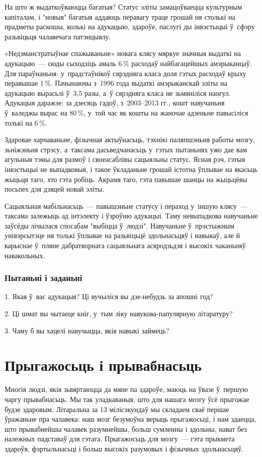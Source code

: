 На што ж выдаткоўваюцца багатыя? Статус эліты замацоўваецца культурным капіталам, і "новыя" багатыя аддаюць перавагу траце грошай ня столькі на прадметы раскошы, колькі на адукацыю, здароўе, паслугі ды інвэстыцыі ў~сфэру разьвіцьця чалавечага патэнцыялу.

«Недэманстратыўнае спажываньне» новага клясу мяркуе значныя выдаткі на адукацыю~--- сюды сыходзіць амаль 6\,\% расходаў найбагацейшых амэрыканцаў. Для параўнаньня: у~прадстаўнікоў сярэдняга класа доля гэтых расходаў крыху перавышае 1\,\%. Пачынаючы з~1996 года выдаткі амэрыканскай эліты на адукацыю вырасьлі ў~3,5 разы, а~ў сярэдняга класа не зьмяніліся наогул. Адукацыя даражэе: за дзесяць гадоў, з~2003--2013 гг., кошт навучаньня ў~каледжы вырас на 80\,\%, у~той час як кошты на жаночае адзеньне павысіліся толькі на 6\,\%.

Здаровае харчаваньне, фізычная актыўнасьць, тэхнікі паляпшэньня работы мозгу, зьніжэньня стрэсу, а~таксама дасьведчанасьць у~гэтых пытаньнях ужо дае вам агульныя тэмы для размоў і своеасаблівы сацыяльны статус. Ясная рэч, гэтыя інвэстыцыі не выпадковыя, і такое ўкладаньне грошай істотна ўплывае на якасьць жыцьця таго, хто гэта робіць. Акрамя таго, гэта павышае шанцы на жыцьцёвы посьпех для дзяцей новай эліты.

Сацыяльная мабільнасьць~--- павышэньне статусу і пераход у~іншую клясу~--- таксама залежыць ад інтэлекту і ўзроўню адукацыі. Таму невыпадкова навучаньне заўсёды лічылася спосабам "выбіцца ў~людзі". Навучаньне ў~прэстыжным унівэрсытэце ня толькі ўплывае на разьвіцьцё здольнасьцяў і навыкаў, але й карыснае ў~пляне дабратворнага сацыяльнага асяродзьдзя і высокіх чаканьняў навакольных.

\subsubsection{Пытаньні і заданьні}

1. Якая ў~вас адукацыя? Ці вучыліся вы дзе-небудзь за апошні год?

2. Ці шмат вы чытаеце кніг, у~тым ліку навукова-папулярную літаратуру?

3. Чаму б вы хацелі навучыцца, якія навыкі займець?


\section{Прыгажосьць і прывабнасьць}

Многія людзі, якія зьвяртаюцца да мяне па здароўе, маюць на ўвазе ў~першую чаргу прывабнасьць. Мы так уладкаваныя, што для нашага мозгу ўсё прыгожае будзе здаровым. Літаральна за 13 мілісэкундаў мы складаем сваё першае ўражаньне пра чалавека: наш мозг безумоўна верыць прыгажосьці, і нам здаецца, што прывабнейшы чалавек разумнейшы, больш сумленны і здольны, нават без належных падставаў для гэтага. Прыгажосьць для мозгу~--- гэта прыкмета здароўя, фэртыльнасьці і больш высокіх разумовых і фізычных здольнасьцяў.


